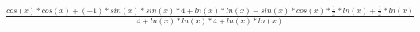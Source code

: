 \documentclass[12pt]{article}
\begin{document}
$\frac{cos(x)*cos(x)+(-1)*sin(x)*sin(x)*4+ln(x)*ln(x)-sin(x)*cos(x)*\frac{1}{x}*ln(x)+\frac{1}{x}*ln(x)}{4+ln(x)*ln(x)*4+ln(x)*ln(x)}$
\end{document}
